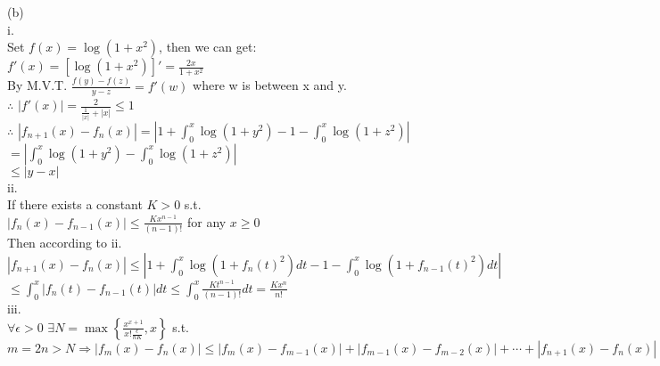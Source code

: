 \documentclass{article}
\begin{document}
(b)\\

i.\\

Set $\displaystyle f(x) = \log{(1 + x^2)}$, then we can get:\\

$f'(x) = \displaystyle \left[\log{(1 + x^2)}\right]' = \frac{2x}{1+x^2}$\\

By M.V.T. \quad $\displaystyle \frac{f(y) - f(z)}{y - z} = f'(w)$ where w is between x and y.\\

$\therefore$ \qquad $\displaystyle \left|f'(x)\right| = \frac{2}{\frac{1}{|x|} + |x|} \leq 1$\\

$\therefore$ \qquad $\displaystyle |f_{n+1}(x) - f_n(x)| = \left|1 + \int_0^x \log{(1 + y^2)} - 1 -\int_0^x \log{(1 + z^2)}\right| $\\

\hskip 3.8cm $\displaystyle = \left| \int_0^x \log{(1 + y^2)} - \int_0^x \log{(1 + z^2)}\right|$\\

\hskip 3.8cm $\displaystyle \leq |y-x|$\\

ii.\\

If there exists a constant $K > 0$ s.t.\\

$\displaystyle |f_n(x) - f_{n-1}(x)| \leq \frac{K x^{n-1}}{(n-1)!}$ for any $x \geq 0$\\

Then according to ii. \quad $\displaystyle |f_{n+1}(x) - f_n(x)| \leq \left|1 + \int_0^x \log{(1 + f_n(t)^2)} dt - 1 - \int_0^x \log{(1 + f_{n-1}(t)^2)} dt\right|$\\

\hskip 6.5cm $\displaystyle \leq \int_0^x \left|f_n(t) - f_{n-1}(t)\right| dt \leq \int_0^x \frac{K t^{n-1}}{(n-1)!} dt = \frac{K x^n}{n!}$\\

iii.\\

$\displaystyle \forall \epsilon > 0$ \quad $\displaystyle \exists N = \max\left\{\frac{x^{x+1}}{x!\frac{\epsilon}{nK}}, x\right\}$ s.t.\\

$\displaystyle m = 2n > N \Rightarrow |f_m(x) - f_n(x)| \leq |f_m(x) - f_{m-1}(x)| + |f_{m-1}(x) - f_{m-2}(x)| + \cdots + |f_{n+1}(x) - f_{n}(x)|$\\
\end{document}
